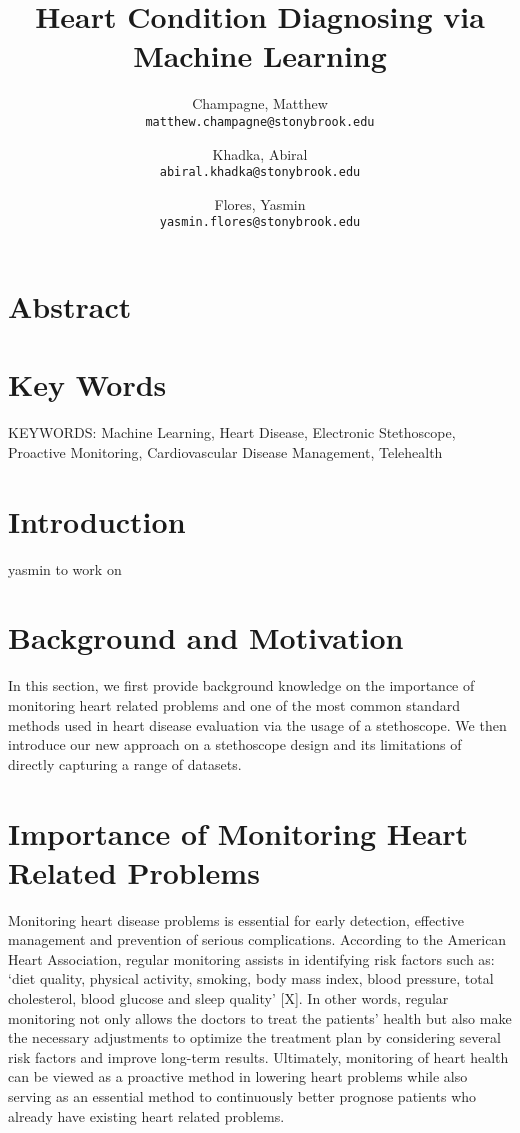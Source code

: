 \documentclass[twocolumn]{article}
\begin{document}
\title{Heart Condition Diagnosing via Machine Learning}
\author{
  Champagne, Matthew \\
  \texttt{matthew.champagne@stonybrook.edu}
  \and
  Khadka, Abiral \\
  \texttt{abiral.khadka@stonybrook.edu}
  \and
  Flores, Yasmin \\
  \texttt{yasmin.flores@stonybrook.edu}
}

\maketitle
\section{Abstract} 


\section{Key Words} 
KEYWORDS: Machine Learning, Heart Disease, Electronic Stethoscope, Proactive Monitoring, Cardiovascular Disease Management, Telehealth 

\section{Introduction}
yasmin to work on 

\section{Background and Motivation} 
In this section, we first provide background knowledge on the importance of monitoring heart related problems 
and one of the most common standard methods used in heart disease evaluation via the usage 
of a stethoscope. We then introduce our new approach on a stethoscope design and its limitations 
of directly capturing a range of datasets.

\section{Importance of Monitoring Heart Related Problems} 
Monitoring heart disease problems is essential for early detection, effective management and prevention of serious complications. 
According to the American Heart Association, regular monitoring assists in identifying risk factors such as: 
‘diet quality, physical activity, smoking, body mass index, blood pressure, total cholesterol, blood glucose and sleep quality’ [X]. 
In other words, regular monitoring not only allows the doctors to treat the patients’ health 
but also make the necessary adjustments to optimize the treatment plan by considering several risk factors 
and improve long-term results. Ultimately, monitoring of heart health can be viewed as a proactive method 
in lowering heart problems while also serving as an essential method to continuously better prognose patients 
who already have existing heart related problems. 
\end{document}
